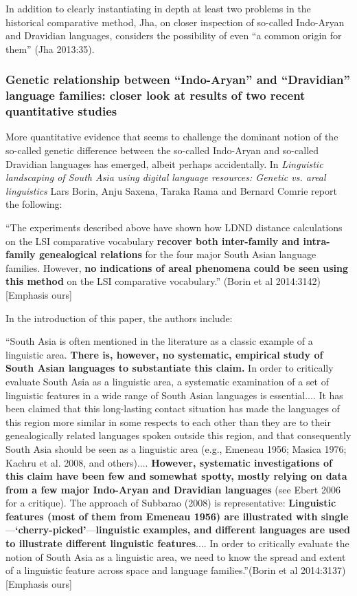 In addition to clearly instantiating in depth at least two problems in the historical comparative method, Jha, on closer inspection of so-called Indo-Aryan and Dravidian languages, considers the possibility of even “a common origin for them” (Jha 2013:35).


\subsubsection{Genetic relationship between “Indo-Aryan” and “Dravidian” language families: closer look at results of two recent quantitative studies}

More quantitative evidence that seems to challenge the dominant notion of the so-called genetic difference between the so-called Indo-Aryan and so-called Dravidian languages has emerged, albeit perhaps accidentally. In \textit{Linguistic landscaping of South Asia using digital language resources: Genetic vs. areal linguistics} Lars Borin, Anju Saxena, Taraka Rama and Bernard Comrie report the following:

\begin{myquote}
“The experiments described above have shown how LDND distance calculations on the LSI comparative vocabulary \textbf{recover both inter-family and intra-family genealogical relations} for the four major South Asian language families. However,\textbf{ no indications of areal phenomena could be seen using this method} on the LSI comparative vocabulary.” \hfill (Borin et al 2014:3142)[Emphasis ours]
\end{myquote}

In the introduction of this paper, the authors include:

\begin{myquote}
“South Asia is often mentioned in the literature as a classic example of a linguistic area. \textbf{There is, however, no systematic, empirical study of South Asian languages to substantiate this claim.} In order to critically evaluate South Asia as a linguistic area, a systematic examination of a set of linguistic features in a wide range of South Asian languages is essential.... It has been claimed that this long-lasting contact situation has made the languages of this region more similar in some respects to each other than they are to their genealogically related languages spoken outside this region, and that consequently South Asia should be seen as a linguistic area (e.g., Emeneau 1956; Masica 1976; Kachru et al. 2008, and others).... \textbf{However, systematic investigations of this claim have been few and somewhat spotty, mostly relying on data from a few major Indo-Aryan and Dravidian languages} (see Ebert 2006 for a critique). The approach of Subbarao (2008) is representative: \textbf{Linguistic features (most of them from Emeneau 1956) are illustrated with single}—\textbf{‘cherry-picked’}—\textbf{linguistic examples, and different languages are used to illustrate different linguistic features}.... In order to critically evaluate the notion of South Asia as a linguistic area, we need to know the spread and extent of a linguistic feature across space and language families.”\hfill (Borin et al 2014:3137) [Emphasis ours]
\end{myquote}

